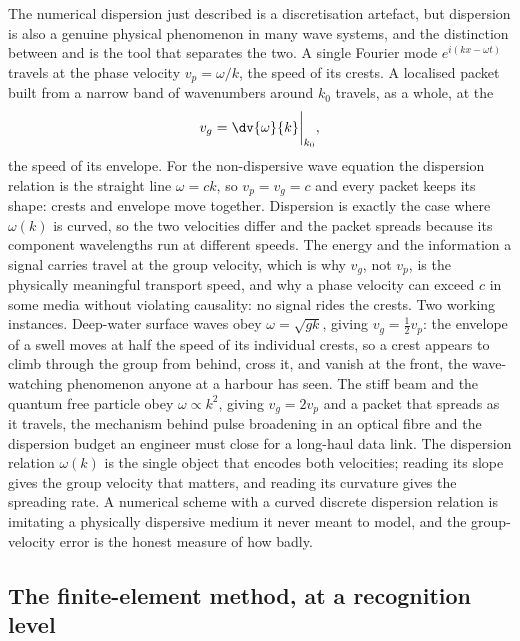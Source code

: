 \begin{mastery}
The numerical dispersion just described is a discretisation artefact,
but dispersion is also a genuine physical phenomenon in many wave
systems, and the distinction between  and
 is the tool that separates the two. A single
Fourier mode $e^{i(kx - \omega t)}$ travels at the phase velocity
$v_{p} = \omega/k$, the speed of its crests. A localised packet built
from a narrow band of wavenumbers around $k_{0}$ travels, as a whole,
at the 
\[
v_{g} = \dv{\omega}{k}\bigg|_{k_{0}},
\]
the speed of its envelope. For the non-dispersive wave equation the
dispersion relation is the straight line $\omega = ck$, so $v_{p} =
v_{g} = c$ and every packet keeps its shape: crests and envelope move
together. Dispersion is exactly the case where $\omega(k)$ is curved,
so the two velocities differ and the packet spreads because its
component wavelengths run at different speeds. The energy and the
information a signal carries travel at the group velocity, which is
why $v_{g}$, not $v_{p}$, is the physically meaningful transport
speed, and why a phase velocity can exceed $c$ in some media without
violating causality: no signal rides the crests. Two working
instances. Deep-water surface waves obey $\omega = \sqrt{gk}$, giving
$v_{g} = \tfrac{1}{2}v_{p}$: the envelope of a swell moves at half the
speed of its individual crests, so a crest appears to climb through
the group from behind, cross it, and vanish at the front, the
wave-watching phenomenon anyone at a harbour has seen. The stiff beam
and the quantum free particle obey $\omega \propto k^{2}$, giving
$v_{g} = 2v_{p}$ and a packet that spreads as it travels, the
mechanism behind pulse broadening in an optical fibre and the
dispersion budget an engineer must close for a long-haul data link.
The dispersion relation $\omega(k)$ is the single object that
encodes both velocities; reading its slope gives the group velocity
that matters, and reading its curvature gives the spreading rate. A
numerical scheme with a curved discrete dispersion relation is
imitating a physically dispersive medium it never meant to model, and
the group-velocity error is the honest measure of how badly.
\end{mastery}

\subsection{The finite-element method, at a recognition level}

